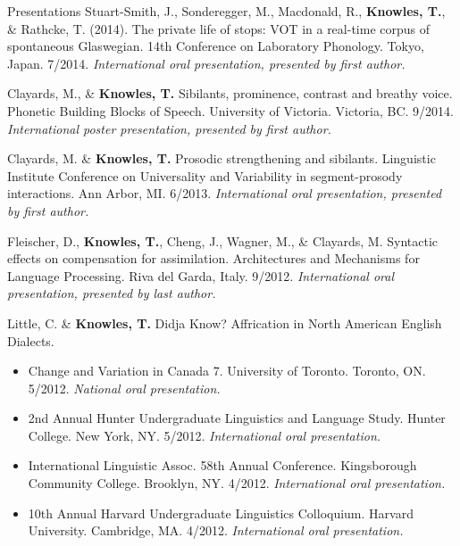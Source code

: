 \documentclass{resume} %
\begin{document}
\begin{rSection}{Presentations}
	Stuart-Smith, J., Sonderegger, M., Macdonald, R., {\bf Knowles, T.}, \& Rathcke, T. (2014). The private life of stops: VOT in a real-time corpus of spontaneous Glaswegian. 14th Conference on Laboratory Phonology. Tokyo, Japan. 7/2014. \emph{International oral presentation, presented by first author.}
	
	Clayards, M., \& {\bf Knowles, T.} Sibilants, prominence, contrast and breathy voice. Phonetic Building Blocks of Speech. University of Victoria. Victoria, BC. 9/2014. \emph{International poster presentation, presented by first author.}
	
	
	Clayards, M. \& {\bf Knowles, T.} Prosodic strengthening and sibilants. Linguistic Institute Conference on Universality and Variability in segment-prosody interactions. Ann Arbor, MI. 6/2013. \emph{International oral presentation, presented by first author.}
	
	Fleischer, D., {\bf Knowles, T.}, Cheng, J., Wagner, M., \& Clayards, M. Syntactic effects on compensation for assimilation. Architectures and Mechanisms for Language Processing. Riva del Garda, Italy. 9/2012. \emph{International oral presentation, presented by last author.}
	
	Little, C. \& {\bf Knowles, T.} Didja Know? Affrication in North American English Dialects.
	\begin{itemize}
				\renewcommand\labelitemi{$\cdot$}
		\item Change and Variation in Canada 7. University of Toronto. Toronto, ON. 5/2012. \emph{National oral presentation.}
		\item 2nd Annual Hunter Undergraduate Linguistics and Language Study. Hunter College. New York, NY. 5/2012. \emph{International oral presentation.}
		\item International Linguistic Assoc. 58th Annual Conference. Kingsborough Community College. Brooklyn, NY. 4/2012. \emph{International oral presentation.}
		\item 10th Annual Harvard Undergraduate Linguistics Colloquium. Harvard University. Cambridge, MA. 4/2012. \emph{International oral presentation.}
	\end{itemize}
	

\end{rSection}
\end{document}
